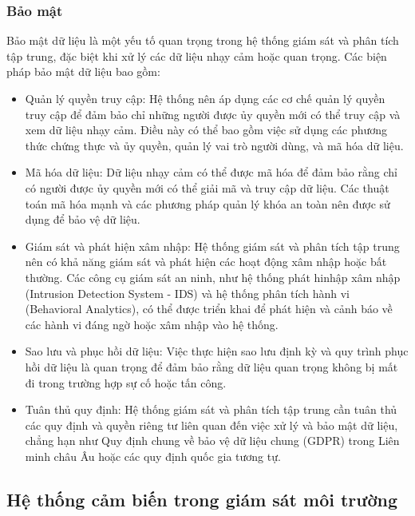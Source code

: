 \subsubsection{Bảo mật}
Bảo mật dữ liệu là một yếu tố quan trọng trong hệ thống giám sát và phân tích tập trung, đặc biệt khi xử lý các dữ liệu nhạy cảm hoặc quan trọng. Các biện pháp bảo mật dữ liệu bao gồm:
\begin{itemize}
    \item Quản lý quyền truy cập: Hệ thống nên áp dụng các cơ chế quản lý quyền truy cập để đảm bảo chỉ những người được ủy quyền mới có thể truy cập và xem dữ liệu nhạy cảm. Điều này có thể bao gồm việc sử dụng các phương thức chứng thực và ủy quyền, quản lý vai trò người dùng, và mã hóa dữ liệu.
    \item Mã hóa dữ liệu: Dữ liệu nhạy cảm có thể được mã hóa để đảm bảo rằng chỉ có người được ủy quyền mới có thể giải mã và truy cập dữ liệu. Các thuật toán mã hóa mạnh và các phương pháp quản lý khóa an toàn nên được sử dụng để bảo vệ dữ liệu.
    \item Giám sát và phát hiện xâm nhập: Hệ thống giám sát và phân tích tập trung nên có khả năng giám sát và phát hiện các hoạt động xâm nhập hoặc bất thường. Các công cụ giám sát an ninh, như hệ thống phát hinhập xâm nhập (Intrusion Detection System - IDS) và hệ thống phân tích hành vi (Behavioral Analytics), có thể được triển khai để phát hiện và cảnh báo về các hành vi đáng ngờ hoặc xâm nhập vào hệ thống.
    \item Sao lưu và phục hồi dữ liệu: Việc thực hiện sao lưu định kỳ và quy trình phục hồi dữ liệu là quan trọng để đảm bảo rằng dữ liệu quan trọng không bị mất đi trong trường hợp sự cố hoặc tấn công.
    \item Tuân thủ quy định: Hệ thống giám sát và phân tích tập trung cần tuân thủ các quy định và quyền riêng tư liên quan đến việc xử lý và bảo mật dữ liệu, chẳng hạn như Quy định chung về bảo vệ dữ liệu chung (GDPR) trong Liên minh châu Âu hoặc các quy định quốc gia tương tự.
\end{itemize}


\subsection{Hệ thống cảm biến trong giám sát môi trường}

